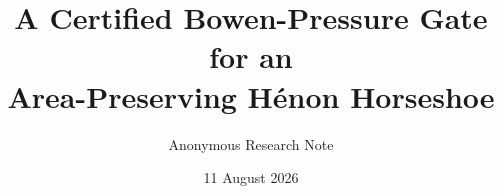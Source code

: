 \documentclass[11pt]{article}
\title{A Certified Bowen-Pressure Gate for an\\
Area-Preserving H\'enon Horseshoe}
\author{Anonymous Research Note}
\date{11 August 2026}
\theoremstyle{definition}
\theoremstyle{remark}
\begin{document}
\maketitle

\begin{abstract}

\end{abstract}












\appendix


\end{document}
